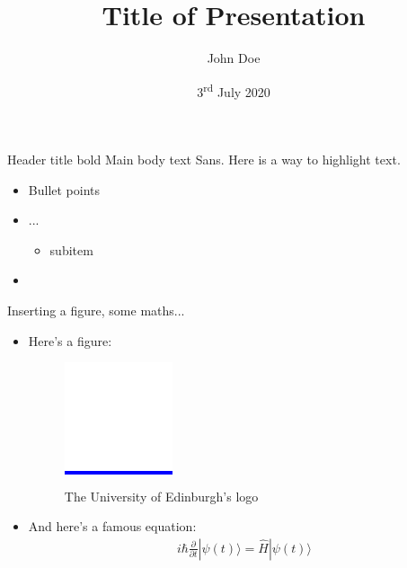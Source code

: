 \documentclass{beamer}
\title[Insert Title (short version of title)]{Title of Presentation}
\author{John Doe}
\date{3\textsuperscript{rd} July 2020}
\begin{document}
\begin{frame}
  \titlepage
\end{frame}

\begin{frame}[t]{Header title bold}
  Main body text Sans. Here is a way to \alert{highlight text}.
  \label{sec:Test1}
  \begin{itemize}
  \item Bullet points
  \item ...
    \begin{itemize}
    \item subitem
    \end{itemize}
  \item \lipsum[2]
  \end{itemize}
\end{frame}



\begin{frame}{Inserting a figure, some maths...}
  \begin{itemize}
  \item   Here's a figure:
    \begin{figure}[h]
      \centering
      \colorbox{blue}{\includegraphics[width=.13\linewidth]{edinburgh-logo}}
      \caption{The University of Edinburgh's logo}
      \label{fig:edinburgh-logo}
    \end{figure}
  \item 
    And here's a famous equation:
  \begin{eqnarray}
    \label{eq:schroedinger}
    i\hbar {\frac {\partial }{\partial t}}|\psi (t)\rangle ={\hat {H}}|\psi (t)\rangle
  \end{eqnarray}
  \end{itemize}
\end{frame}
\end{document}
